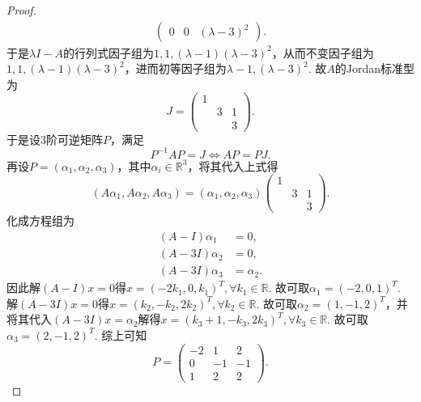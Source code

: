 \documentclass[../../main.tex]{subfiles}%
\begin{document}
\begin{proof}
\begin{align*}
\begin{pmatrix}
0 & 0 & (\lambda - 3)^2
\end{pmatrix}.
\end{align*}
于是$\lambda I - A$的行列式因子组为$1, 1, (\lambda - 1)(\lambda - 3)^2$，从而不变因子组为$1, 1, (\lambda - 1)(\lambda - 3)^2$，进而初等因子组为$\lambda - 1, (\lambda - 3)^2$.
故$A$的Jordan标准型为
\[
J = 
\begin{pmatrix}
1 & & \\
& 3 & 1 \\
& & 3
\end{pmatrix}.
\]
于是设3阶可逆矩阵$P$，满足
\[
P^{-1}AP = J \Longleftrightarrow AP = PJ.
\]
再设$P = (\alpha_1, \alpha_2, \alpha_3)$，其中$\alpha_i \in \mathbb{R}^3$，将其代入上式得
\[
(A\alpha_1, A\alpha_2, A\alpha_3) = (\alpha_1, \alpha_2, \alpha_3)
\begin{pmatrix}
1 & & \\
& 3 & 1 \\
& & 3
\end{pmatrix}.
\]
化成方程组为
\begin{align*}
(A - I)\alpha_1 &= 0, \\
(A - 3I)\alpha_2 &= 0, \\
(A - 3I)\alpha_3 &= \alpha_2.
\end{align*}
因此解$(A - I)x = 0$得$x = (-2k_1, 0, k_1)^T, \forall k_1 \in \mathbb{R}$. 故可取$\alpha_1 = (-2, 0, 1)^T$. 解$(A - 3I)x = 0$得$x = (k_2, -k_2, 2k_2)^T, \forall k_2 \in \mathbb{R}$. 故可取$\alpha_2 = (1, -1, 2)^T$，并将其代入$(A - 3I)x = \alpha_2$解得$x = (k_3 + 1, -k_3, 2k_3)^T, \forall k_3 \in \mathbb{R}$. 故可取$\alpha_3 = (2, -1, 2)^T$.
综上可知
\[
P = 
\begin{pmatrix}
-2 & 1 & 2 \\
0 & -1 & -1 \\
1 & 2 & 2
\end{pmatrix}.
\]
\end{proof}
\end{document}
